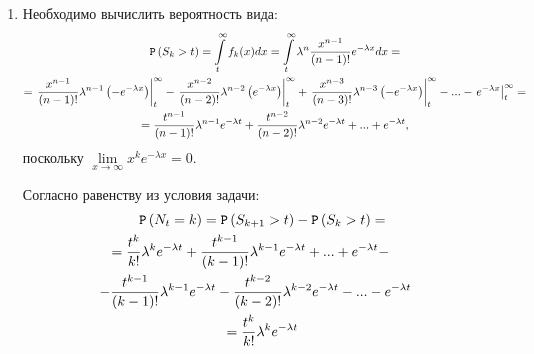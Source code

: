 \documentclass[12pt]{article}
\begin{document}
\begin{enumerate}
        \item Необходимо вычислить вероятность вида:
        \begin{multline*}
            \mathtt{P} \left ( S_k > t \right )
            = \int \limits_t^{\infty} f_k(x) dx
            = \int \limits_t^{\infty} \lambda^n \frac{x^{n-1}}{(n-1)!} e^{- \lambda x} dx = \\
            =
            \left . \frac{x^{n-1}}{(n-1)!} \lambda^{n-1} \left ( - e^{-\lambda x } \right ) \right |_t^{\infty}
            - \left . \frac{x^{n-2}}{(n-2)!} \lambda^{n-2} \left ( e^{-\lambda x } \right ) \right |_t^{\infty}
            + \left . \frac{x^{n-3}}{(n-3)!} \lambda^{n-3} \left ( - e^{-\lambda x } \right ) \right |_t^{\infty}
            - ...
            - \left . e^{-\lambda x} \right |_t^\infty = \\
            = \frac{t^{n-1}}{(n-1)!} \lambda^{n-1} e^{-\lambda t}
            + \frac{t^{n-2}}{(n-2)!} \lambda^{n-2} e^{-\lambda t}
            + ...
            + e^{-\lambda t},
        \end{multline*}
        поскольку $\lim \limits_{x \rightarrow \infty} x^k e^{- \lambda x} = 0$.

        Согласно равенству из условия задачи:
        \begin{multline*}
            \probability{N_t = k}
            = \probability{S_{k+1} > t} - \probability{S_k > t} = \\
            \shoveleft{
                = \frac{t^k}{k!} \lambda^{k} e^{-\lambda t}
                + \frac{t^{k-1}}{(k-1)!} \lambda^{k-1} e^{-\lambda t}
                + ...
                + e^{-\lambda t} - } \\
            \shoveright{
                - \frac{t^{k-1}}{(k-1)!} \lambda^{k-1} e^{-\lambda t}
                - \frac{t^{k-2}}{(k-2)!} \lambda^{k-2} e^{-\lambda t}
                - ...
                - e^{-\lambda t} } \\
            = \frac{t^k}{k!} \lambda^{k} e^{-\lambda t}
        \end{multline*}
    \end{enumerate}
\end{document}
